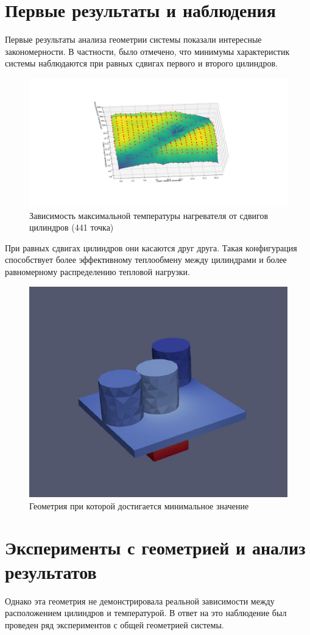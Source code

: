 \documentclass[a4paper,12pt]{article}
\theoremstyle{plain} %
\theoremstyle{definition} %
\theoremstyle{remark} %
\begin{document}
\section{Первые результаты и наблюдения}

Первые результаты анализа геометрии системы показали интересные закономерности. В частности, было отмечено, что минимумы характеристик системы наблюдаются при равных сдвигах первого и второго цилиндров.

\begin{figure}[h]
	\begin{center}
		\includegraphics[width=0.4\linewidth]{images/18.3.jpg}
		\caption{Зависимость максимальной температуры нагревателя от сдвигов цилиндров (441 точка)} %
	\end{center}
\end{figure}

При равных сдвигах цилиндров они касаются друг друга. Такая конфигурация способствует более эффективному теплообмену между цилиндрами и более равномерному распределению тепловой нагрузки.

\begin{figure}[h]
	\begin{center}
		\includegraphics[width=0.4\linewidth]{images/19.jpg}
		\caption{Геометрия при которой достигается минимальное значение} %
	\end{center}
\end{figure}

\section{Эксперименты с геометрией и анализ результатов}

Однако эта геометрия не демонстрировала реальной зависимости между расположением цилиндров и температурой. В ответ на это наблюдение был проведен ряд экспериментов с общей геометрией системы.
\end{document}
